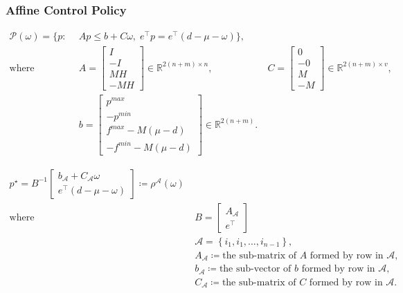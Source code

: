 \documentclass[11pt]{article}
\begin{document}
\subsubsection{Affine Control Policy}
\begin{align}\label{eq:opf_poly_compact}
\mathcal{P}\left ( \omega \right ) =  \{ p:
~ &~ Ap\leq b+C\omega, \; e^{\top }p=e^{\top }\left ( d-\mu -\omega  \right )  \}, \\
\text{where}
~ &~ A=\begin{bmatrix}I\\ -I\\ MH\\ -MH\end{bmatrix} \in \mathbb{R}^{2\left(n+m\right)\times n},
~ &~ C=\begin{bmatrix}0\\ -0\\ M\\ -M\end{bmatrix} \in \mathbb{R}^{2\left(n+m\right)\times v}, \nonumber \\
~ &~ b=\begin{bmatrix}p^{max}\\ -p^{min}\\ f^{max}-M\left(\mu-d\right)\\ -f^{min}-M\left(\mu-d\right)\end{bmatrix} \in \mathbb{R}^{2\left(n+m\right)}. \nonumber
\end{align}

\begin{align}\label{eq:opf_affine}
p^{\star}=B^{-1}\begin{bmatrix}
b_{\mathcal{A}}+C_{\mathcal{A}}\omega\\ 
e^{\top}\left(d-\mu-\omega\right)
\end{bmatrix} \coloneqq\rho^{\mathcal{A}}\left(\omega\right) \\
\text{where}
~ &~ B=\begin{bmatrix} A_{\mathcal{A}}\\ e^{\top} \end{bmatrix} \nonumber \\
~ &~ \mathcal{A} = \left \{ i_{1}, i_{1}, ..., i_{n-1} \right \}, \nonumber \\
~ &~ A_{\mathcal{A}} \coloneqq \text{the sub-matrix of } A \text{ formed by row in } \mathcal{A}, \nonumber \\
~ &~ b_{\mathcal{A}} \coloneqq \text{the sub-vector of } b \text{ formed by row in } \mathcal{A}, \nonumber \\
~ &~ C_{\mathcal{A}} \coloneqq \text{the sub-matrix of } C \text{ formed by row in } \mathcal{A}. \nonumber
\end{align}
\end{document}
